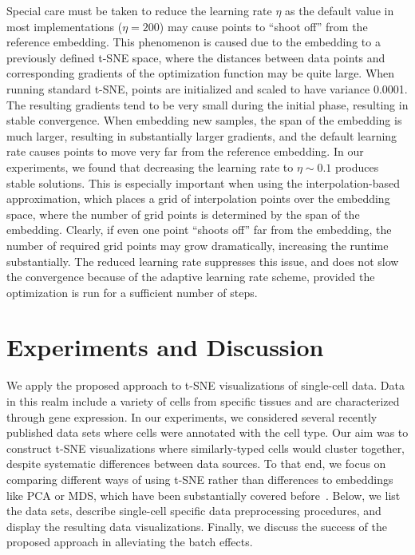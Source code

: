 \documentclass[runningheads]{llncs}
\begin{document}
Special care must be taken to reduce the learning rate $\eta$ as the default
value in most implementations ($\eta = 200$) may cause points to ``shoot off''
from the reference embedding. This phenomenon is caused due to the embedding to
a previously defined t-SNE space, where the distances between data points and
corresponding gradients of the optimization function may be quite large. When
running standard t-SNE, points are initialized and scaled to have variance
0.0001. The resulting gradients tend to be very small during the initial phase,
resulting in stable convergence. When embedding new samples, the span of the
embedding is much larger, resulting in substantially larger gradients, and the default
learning rate causes points to move very far from the reference embedding. In
our experiments, we found that decreasing the learning rate to $\eta \sim 0.1$
produces stable solutions. This is especially important when using the
interpolation-based approximation, which places a grid of interpolation
points over the embedding space, where the number of grid points is determined
by the span of the embedding. Clearly, if even one point ``shoots off'' far from the
embedding, the number of required grid points may grow dramatically,
increasing the runtime substantially. The reduced learning rate suppresses this issue, and
does not slow the convergence because of the adaptive learning rate scheme, provided
the optimization is run for a sufficient number of steps. 

\section{Experiments and Discussion}

We apply the proposed approach to t-SNE visualizations of
single-cell data. Data in this realm include a variety of
cells from specific tissues and are characterized through gene expression.
In our experiments, we considered several recently published data
sets where cells were annotated with the cell type. Our aim was to construct
t-SNE visualizations where similarly-typed cells would cluster together,
despite systematic differences between data sources. To that end, we focus
on comparing different ways of using t-SNE rather than differences to embeddings like PCA or MDS, which
have been substantially covered before~\cite{tsne,umap_single_cell}. 
Below, we list the data sets,
describe single-cell specific data preprocessing procedures, and display the
resulting data visualizations. Finally, we discuss the success of the proposed
approach in alleviating the batch effects.
\end{document}
